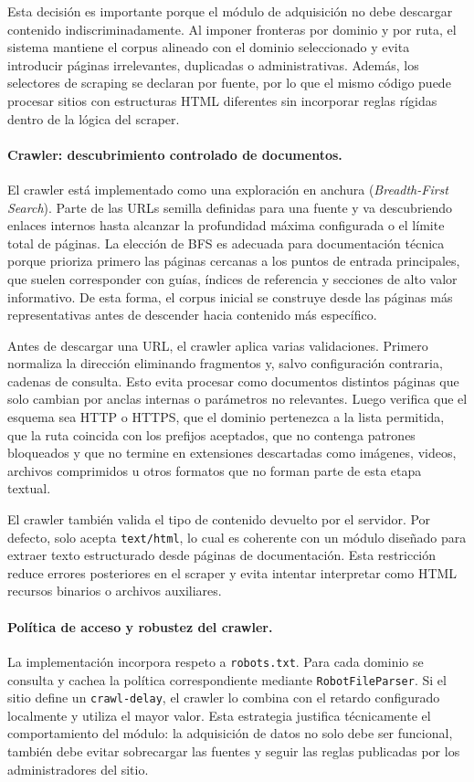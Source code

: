 \documentclass[11pt]{article}
\begin{document}
Esta decisión es importante porque el módulo de adquisición no debe descargar contenido
indiscriminadamente. Al imponer fronteras por dominio y por ruta, el sistema mantiene el corpus
alineado con el dominio seleccionado y evita introducir páginas irrelevantes, duplicadas o
administrativas. Además, los selectores de scraping se declaran por fuente, por lo que el mismo
código puede procesar sitios con estructuras HTML diferentes sin incorporar reglas rígidas dentro
de la lógica del scraper.

\paragraph{Crawler: descubrimiento controlado de documentos.}
El crawler está implementado como una exploración en anchura (\emph{Breadth-First Search}).
Parte de las URLs semilla definidas para una fuente y va descubriendo enlaces internos hasta
alcanzar la profundidad máxima configurada o el límite total de páginas. La elección de BFS es
adecuada para documentación técnica porque prioriza primero las páginas cercanas a los puntos de
entrada principales, que suelen corresponder con guías, índices de referencia y secciones de alto
valor informativo. De esta forma, el corpus inicial se construye desde las páginas más
representativas antes de descender hacia contenido más específico.

Antes de descargar una URL, el crawler aplica varias validaciones. Primero normaliza la dirección
eliminando fragmentos y, salvo configuración contraria, cadenas de consulta. Esto evita procesar
como documentos distintos páginas que solo cambian por anclas internas o parámetros no
relevantes. Luego verifica que el esquema sea HTTP o HTTPS, que el dominio pertenezca a la lista
permitida, que la ruta coincida con los prefijos aceptados, que no contenga patrones bloqueados y
que no termine en extensiones descartadas como imágenes, videos, archivos comprimidos u otros
formatos que no forman parte de esta etapa textual.

El crawler también valida el tipo de contenido devuelto por el servidor. Por defecto, solo acepta
\texttt{text/html}, lo cual es coherente con un módulo diseñado para extraer texto estructurado
desde páginas de documentación. Esta restricción reduce errores posteriores en el scraper y evita
intentar interpretar como HTML recursos binarios o archivos auxiliares.

\paragraph{Política de acceso y robustez del crawler.}
La implementación incorpora respeto a \texttt{robots.txt}. Para cada dominio se consulta y cachea
la política correspondiente mediante \texttt{RobotFileParser}. Si el sitio define un
\texttt{crawl-delay}, el crawler lo combina con el retardo configurado localmente y utiliza el mayor
valor. Esta estrategia justifica técnicamente el comportamiento del módulo: la adquisición de
datos no solo debe ser funcional, también debe evitar sobrecargar las fuentes y seguir las reglas
publicadas por los administradores del sitio.
\end{document}
